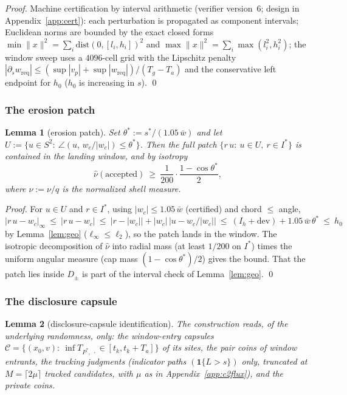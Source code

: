\documentclass[11pt]{article}
\newtheorem{lemma}{Lemma}
\newcommand{\Ta}{T_a}
\newcommand{\Tg}{T_g}
\newcommand{\wbar}{\bar w}
\begin{document}
\noindent\emph{Proof.} Machine certification by interval arithmetic
(verifier version~6; design in Appendix~\ref{app:cert}): each perturbation
is propagated as component intervals; Euclidean norms are bounded by the
exact closed forms $\min\|x\|^2=\sum_i\mathrm{dist}(0,[l_i,h_i])^2$ and
$\max\|x\|^2=\sum_i\max(l_i^2,h_i^2)$; the window sweep uses a $4096$-cell
grid with the Lipschitz penalty
$|\partial_s w_{\mathrm{req}}|\le(\sup|v_p|+\sup|w_{\mathrm{req}}|)/(\Tg-\Ta)$
and the conservative left endpoint for $h_0$ ($h_0$ is increasing in $s$).
\qed

\subsubsection{The erosion patch}\label{app:c2patch}

\begin{lemma}[erosion patch]\label{lem:patch}
Set $\theta^*:=s^*/(1.05\,\wbar)$ and let
$U:=\{u\in S^2:\ \angle(u,\,w_c/|w_c|)\le\theta^*\}$. Then the full patch
$\{r\,u:\ u\in U,\ r\in I^*\}$ is contained in the landing window, and by
isotropy
\[
  \hat\nu(\mathrm{accepted})\ \ge\ \frac{1}{200}\cdot
  \frac{1-\cos\theta^*}{2},
\]
where $\hat\nu:=\nu/q$ is the normalized shell measure.
\end{lemma}

\noindent\emph{Proof.} For $u\in U$ and $r\in I^*$, using
$|w_c|\le1.05\,\wbar$ (certified) and chord $\le$ angle,
\[
  |r\,u-w_c|_\infty\ \le\ |r\,u-w_c|\ \le\ \bigl|r-|w_c|\bigr|
  +|w_c|\,\bigl|u-w_c/|w_c|\bigr|\ \le\ (I_h+\mathrm{dev})
  +1.05\,\wbar\,\theta^*\ \le\ h_0
\]
by Lemma~\ref{lem:geo} ($\ell_\infty\le\ell_2$), so the patch lands in the
window. The isotropic decomposition of $\hat\nu$ into radial mass (at least
$1/200$ on $I^*$) times the uniform angular measure (cap mass
$(1-\cos\theta^*)/2$) gives the bound. That the patch lies inside $D_\pm$
is part of the interval check of Lemma~\ref{lem:geo}. \qed

\subsubsection{The disclosure capsule}\label{app:c2capsule}

\begin{lemma}[disclosure-capsule identification]\label{lem:capsuleid}
The construction reads, of the underlying randomness, only: the
window-entry capsules
$\mathcal{C}=\{(x_0,v):\ \inf T_{P^*\!,\;\cdot}\in[t_k,t_k+\Ta]\}$ of its
sites, the pair coins of window entrants, the tracking judgments
(indicator paths $(\mathbf 1\{L>s\})$ only, truncated at
$M=\lceil2\mu\rceil$ tracked candidates, with $\mu$ as in
Appendix~\ref{app:c2flux}), and the private coins.
\end{lemma}
\end{document}
